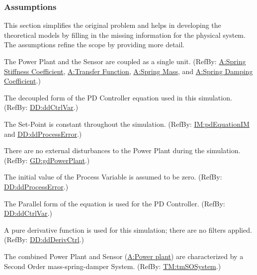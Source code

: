 \documentclass[12pt]{article}
\begin{document}
\subsubsection{Assumptions}
\label{Sec:Assumps}
This section simplifies the original problem and helps in developing the theoretical models by filling in the missing information for the physical system. The assumptions refine the scope by providing more detail.

\begin{description}[font=\normalfont]
\item[Power plant:\phantomsection\label{pwrPlant}]{The Power Plant and the Sensor are coupled as a single unit. (RefBy: \hyperref[stiffnessCoeffSpring]{A:Spring Stiffness Coefficient}, \hyperref[pwrPlantTxFnx]{A:Transfer Function}, \hyperref[massSpring]{A:Spring Mass}, and \hyperref[dampingCoeffSpring]{A:Spring Damping Coefficient}.)}
\item[Decoupled equation:\phantomsection\label{decoupled}]{The decoupled form of the PD Controller equation used in this simulation. (RefBy: \hyperref[DD:ddCtrlVar]{DD:ddCtrlVar}.)}
\item[Set-Point:\phantomsection\label{setPointConstant}]{The Set-Point is constant throughout the simulation. (RefBy: \hyperref[IM:pdEquationIM]{IM:pdEquationIM} and \hyperref[DD:ddProcessError]{DD:ddProcessError}.)}
\item[External disturbance:\phantomsection\label{externalDisturb}]{There are no external disturbances to the Power Plant during the simulation. (RefBy: \hyperref[GD:gdPowerPlant]{GD:gdPowerPlant}.)}
\item[Initial Value:\phantomsection\label{initialValue}]{The initial value of the Process Variable is assumed to be zero. (RefBy: \hyperref[DD:ddProcessError]{DD:ddProcessError}.)}
\item[Parallel Equation:\phantomsection\label{parallelEq}]{The Parallel form of the equation is used for the PD Controller. (RefBy: \hyperref[DD:ddCtrlVar]{DD:ddCtrlVar}.)}
\item[Unfiltered Derivative:\phantomsection\label{unfilteredDerivative}]{A pure derivative function is used for this simulation; there are no filters applied. (RefBy: \hyperref[DD:ddDerivCtrl]{DD:ddDerivCtrl}.)}
\item[Transfer Function:\phantomsection\label{pwrPlantTxFnx}]{The combined Power Plant and Sensor (\hyperref[pwrPlant]{A:Power plant}) are characterized by a Second Order mass-spring-damper System. (RefBy: \hyperref[TM:tmSOSystem]{TM:tmSOSystem}.)}

\end{description}
\end{document}
